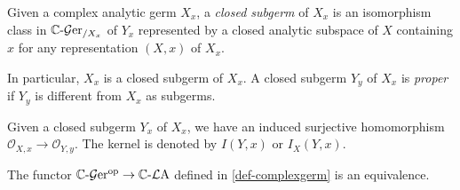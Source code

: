 \begin{definition}\label{def-closedsubgerm}
    Given a complex analytic germ $X_x$, a \emph{closed subgerm} of $X_x$ is an isomorphism class in $\mathbb{C}\text{-}\mathcal{G}\mathrm{er}_{/X_x}$ of $Y_x$ represented by a closed analytic subspace of $X$ containing $x$ for any representation $(X,x)$ of $X_x$.

    In particular, $X_x$ is a closed subgerm of $X_x$. A closed subgerm $Y_y$ of $X_x$ is \emph{proper} if $Y_y$ is different from $X_x$ as subgerms. 

    Given a closed subgerm $Y_x$ of $X_x$, we have an induced surjective homomorphism $\mathcal{O}_{X,x}\rightarrow \mathcal{O}_{Y,y}$. The kernel is denoted by $I(Y,x)$ or $I_X(Y,x)$.
\end{definition}

\begin{thm}\label{thm-germlocalringequivalence}
    The functor $\mathbb{C}\text{-}\mathcal{G}\mathrm{er}^{\mathrm{op}}\rightarrow \mathbb{C}\text{-}\mathcal{L}\mathrm{A}$ defined in \cref{def-complexgerm} is an equivalence.
\end{thm}
